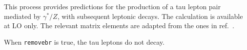 \label{subsec:tautau}

This process provides predictions for the production of a tau lepton
pair mediated by $\gamma^*/Z$, with subsequent leptonic decays. The
calculation is available at LO only. The relevant matrix elements are
adapted from the ones in ref.~\cite{Kleiss:1988xr}.

When {\tt removebr} is true, the tau leptons do not decay.
